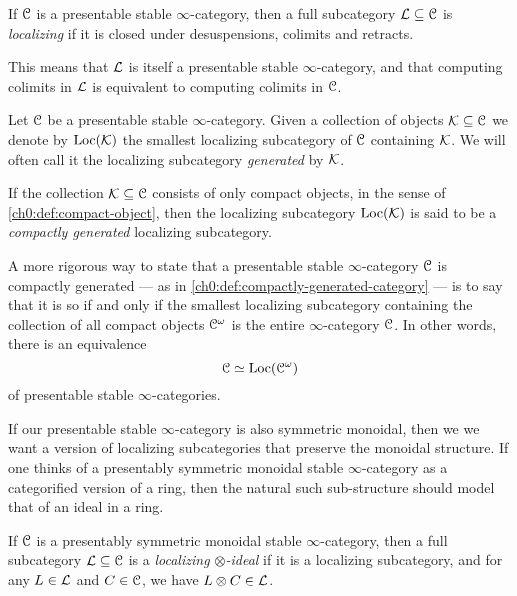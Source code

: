 \begin{definition}
    \label{ch0:def:localizing-subcategory}
    If $\EuScript{C}$ is a presentable stable $\infty$-category, then a full subcategory $\mathcal{L}\subseteq \EuScript{C}$ is \emph{localizing} if it is closed under desuspensions, colimits and retracts. 
\end{definition}

This means that $\mathcal{L}$ is itself a presentable stable $\infty$-category, and that computing colimits in $\mathcal{L}$ is equivalent to computing colimits in $\EuScript{C}$. 

\begin{definition}
    Let $\EuScript{C}$ be a presentable stable $\infty$-category. Given a collection of objects $\mathcal{K}\subseteq \EuScript{C}$ we denote by $\operatorname{Loc}(\mathcal{K})$ the smallest localizing subcategory of $\EuScript{C}$ containing $\mathcal{K}$. We will often call it the localizing subcategory \emph{generated} by $\mathcal{K}$. 
\end{definition}

\begin{remark}
    \label{ch0:rm:compactly-generated-localizing-subcategory}
    If the collection $\mathcal{K} \subseteq \EuScript{C}$ consists of only compact objects, in the sense of \cref{ch0:def:compact-object}, then the localizing subcategory $\operatorname{Loc}(\mathcal{K})$ is said to be a \emph{compactly generated} localizing subcategory. 
\end{remark}

\begin{remark}
    A more rigorous way to state that a presentable stable $\infty$-category $\EuScript{C}$ is compactly generated --- as in \cref{ch0:def:compactly-generated-category} --- is to say that it is so if and only if the smallest localizing subcategory containing the collection of all compact objects $\EuScript{C}^\omega$ is the entire $\infty$-category $\EuScript{C}$. In other words, there is an equivalence  
    \[\EuScript{C}\simeq \operatorname{Loc}(\EuScript{C}^\omega)\]
    of presentable stable $\infty$-categories. 
\end{remark}

If our presentable stable $\infty$-category is also symmetric monoidal, then we we want a version of localizing subcategories that preserve the monoidal structure. If one thinks of a presentably symmetric monoidal stable $\infty$-category as a categorified version of a ring, then the natural such sub-structure should model that of an ideal in a ring. 

\begin{definition}
    \label{ch0:def:localizing-ideal}
    If $\EuScript{C}$ is a presentably symmetric monoidal stable $\infty$-category, then a full subcategory $\mathcal{L}\subseteq \EuScript{C}$ is a \emph{localizing $\otimes$-ideal} if it is a localizing subcategory, and for any $L\in \mathcal{L}$ and $C\in \EuScript{C}$, we have $L\otimes C\in \mathcal{L}$. 
\end{definition}

